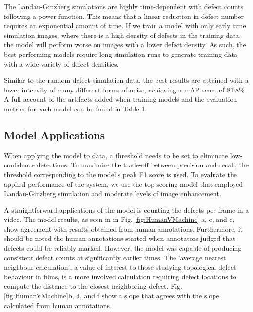 \documentclass[prl,reprint,showpacs,floatfix,nofootinbib]{revtex4-1}
\begin{document}
The Landau-Ginzberg simulations are highly time-dependent with defect counts following a power function. This means that a linear reduction in defect number requires an exponential amount of time. If we train a model with only early time simulation images, where there is a high density of defects in the training data, the model will perform worse on images with a lower defect density. As such, the best performing models require long simulation runs to generate training data with a wide variety of defect densities. 

Similar to the random defect simulation data, the best results are attained with a lower intensity of many different forms of noise, achieving a mAP score of $81.8\%$. A full account of the artifacts added when training models and the evaluation metrics for each model can be found in Table 1.

\subsection{Model Applications}

When applying the model to data, a threshold needs to be set to eliminate low-confidence detections. To maximize the trade-off between precision and recall, the threshold corresponding to the model's peak F1 score is used. To evaluate the applied performance of the system, we use the top-scoring model that employed Landau-Ginzberg simulation and moderate levels of image enhancement.%

A straightforward applications of the model is counting the defects per frame in a video. The model results, as seen in  in Fig. \ref{fig:HumanVMachine} a, c, and e, show agreement with results obtained from human annotations. Furthermore, it should be noted the human annotations started when annotators judged that defects could be reliably marked. However, the model was capable of producing consistent defect counts at significantly earlier times.
The 'average nearest neighbour calculation', a value of interest to those studying topological defect behaviour in films, is a more involved calculation requiring defect locations to compute the distance to the closest neighboring defect. Fig. \ref{fig:HumanVMachine}b, d, and f show a slope that agrees with the slope calculated from human annotations. %
\end{document}
